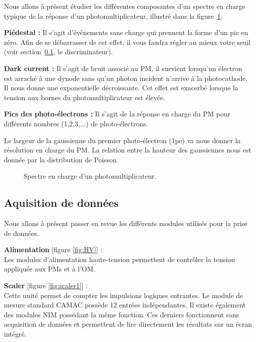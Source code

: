 Nous allons à présent étudier les différentes composantes d'un spectre en charge typique de la réponse d'un photomultiplicateur, illustré dans la figure~\ref{fig:spectre}.

\textbf{Piédestal :} Il s'agit d'évènements sans charge qui prennent la forme d'un pic en zéro. Afin de se débarrasser de cet effet, il vous faudra régler au mieux votre seuil (voir section~\ref{sec:materiel}, le discriminateur).

\textbf{Dark current :} Il s'agit de bruit associé au PM, il survient lorsqu'un électron est arraché à une dynode sans qu'un photon incident n'arrive à la photocathode. Il nous donne une exponentielle décroissante. Cet effet est exacerbé lorsque la tension aux bornes du photomultiplicateur est élevée.

\textbf{Pics des photo-électrons :} Il s'agit de la réponse en charge du PM pour différents nombres (1,2,3,...) de photo-électrons.

Le largeur de la gaussienne du premier photo-électron (1pe) va nous donner la résolution en charge du PM. La relation entre la hauteur des gaussiennes nous est donnée par la distribution de Poisson.

\begin{figure}
    \caption{\label{fig:spectre} Spectre en charge d'un photomultiplicateur.}
\end{figure}

\FloatBarrier

\subsection{Aquisition de donn{\'e}es}
\label{sec:materiel}
Nous allons à présent passer en revue les différents modules utilisés pour la prise de données.

\textbf{Alimentation} [figure \ref{fig:HV}] :\\
Les modules d'alimentation haute-tension permettent de contrôler la tension appliquée aux PMs et à l'OM.

\textbf{Scaler} [figure \ref{fig:scaler1}] :\\
Cette unité permet de compter les impulsions logiques entrantes. Le module de mesure standard CAMAC possède 12 entrées indépendantes. Il existe également des modules NIM possédant la même fonction. Ces derniers fonctionnent sans acquisition de données et permettent de lire directement les résultats sur un écran intégré.

